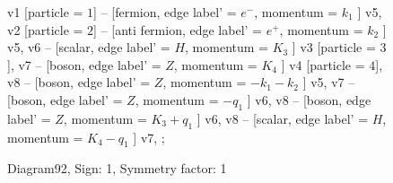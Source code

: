 \documentclass{revtex4}
\begin{document}
\begin{figure}[!htb]
\begin{center}
{    %
v1 [particle = \(1\)] -- [fermion, edge label' = \(e^{-}\), momentum = \(k_{1}\) ] v5, 
v2 [particle = \(2\)] -- [anti fermion, edge label' = \(e^{+}\), momentum = \(k_{2}\) ] v5, 
v6 -- [scalar, edge label' = \(H\), momentum = \(K_{3}\) ] v3 [particle = \(3\)], 
v7 -- [boson, edge label' = \(Z\), momentum = \(K_{4}\) ] v4 [particle = \(4\)], 
v8 -- [boson, edge label' = \(Z\), momentum = \(-k_{1} - k_{2}\) ] v5, 
v7 -- [boson, edge label' = \(Z\), momentum = \(-q_{1}\) ] v6, 
v8 -- [boson, edge label' = \(Z\), momentum = \(K_{3} + q_{1}\) ] v6, 
v8 -- [scalar, edge label' = \(H\), momentum = \(K_{4} - q_{1}\) ] v7, 
};
\end{center}
\caption{Diagram92, Sign: 1, Symmetry factor: 1}
\end{figure}
\newpage
\end{document}
